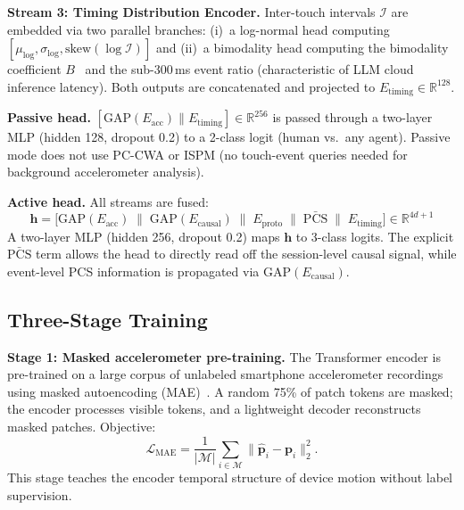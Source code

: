 \noindent\textbf{Stream 3: Timing Distribution Encoder.}
Inter-touch intervals $\mathcal{I}$ are embedded via two parallel branches:
(i)~a log-normal head computing $[\mu_{\log}, \sigma_{\log}, \mathrm{skew}(\log \mathcal{I})]$
and (ii)~a bimodality head computing the bimodality coefficient $B$~\cite{bimodality1985}
and the sub-300\,ms event ratio (characteristic of LLM cloud inference latency).%
Both outputs are concatenated and projected to $E_{\mathrm{timing}} \in \mathbb{R}^{128}$.%

\noindent\textbf{Passive head.}
$[\mathrm{GAP}(E_{\mathrm{acc}}) \| E_{\mathrm{timing}}] \in \mathbb{R}^{256}$
is passed through a two-layer MLP (hidden 128, dropout 0.2) to a 2-class logit
(human vs.\ any agent).%
Passive mode does not use PC-CWA or ISPM (no touch-event queries needed for
background accelerometer analysis).%

\noindent\textbf{Active head.}
All streams are fused:
\begin{equation}
\mathbf{h} = \bigl[
  \mathrm{GAP}(E_{\mathrm{acc}}) \;\|\;
  \mathrm{GAP}(E_{\mathrm{causal}}) \;\|\;
  E_{\mathrm{proto}} \;\|\;
  \bar{\mathrm{PCS}} \;\|\;
  E_{\mathrm{timing}}
\bigr] \in \mathbb{R}^{4d+1}
\label{eq:fusion}
\end{equation}
A two-layer MLP (hidden 256, dropout 0.2) maps $\mathbf{h}$ to 3-class logits.%
The explicit $\bar{\mathrm{PCS}}$ term allows the head to directly read off the
session-level causal signal, while event-level PCS information is propagated
via $\mathrm{GAP}(E_{\mathrm{causal}})$.%

\subsection{Three-Stage Training}
\label{sec:training}

\noindent\textbf{Stage 1: Masked accelerometer pre-training.}
The Transformer encoder is pre-trained on a large corpus of unlabeled smartphone
accelerometer recordings using masked autoencoding (MAE)~\cite{he2022mae,patchtst2023,simmtm2023}.%
A random 75\% of patch tokens are masked; the encoder processes visible tokens, and a
lightweight decoder reconstructs masked patches.%
Objective:
\begin{equation}
\mathcal{L}_{\mathrm{MAE}} = \frac{1}{|\mathcal{M}|} \sum_{i \in \mathcal{M}}
  \|\hat{\mathbf{p}}_i - \mathbf{p}_i\|_2^2.
\label{eq:mae}
\end{equation}
This stage teaches the encoder temporal structure of device motion without label supervision.%

